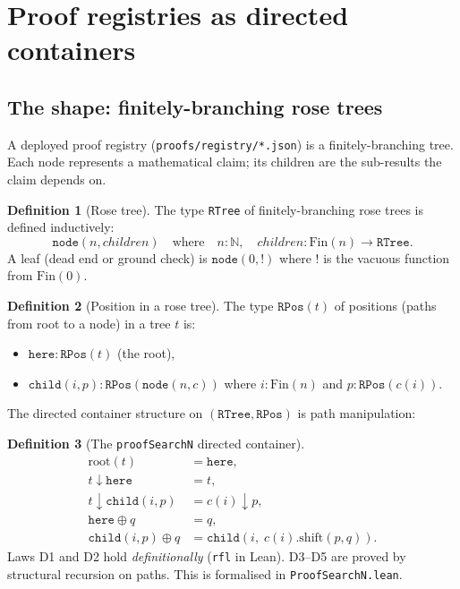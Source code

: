 \documentclass[11pt,a4paper]{article}
\theoremstyle{definition}
\newtheorem{definition}{Definition}[section]
\theoremstyle{plain}
\theoremstyle{remark}
\newcommand{\sub}{\mathop{\downarrow}}
\begin{document}
\section{Proof registries as directed containers}

\subsection{The shape: finitely-branching rose trees}

A deployed proof registry (\texttt{proofs/registry/*.json}) is a
finitely-branching tree. Each node represents a mathematical claim; its
children are the sub-results the claim depends on.

\begin{definition}[Rose tree]
The type \texttt{RTree} of finitely-branching rose trees is defined
inductively:
\[
  \texttt{node}(n, \mathit{children}) \quad\text{where}\quad
  n : \mathbb{N},\quad \mathit{children} : \mathrm{Fin}(n) \to \texttt{RTree}.
\]
A leaf (dead end or ground check) is $\texttt{node}(0, !)$ where $!$
is the vacuous function from $\mathrm{Fin}(0)$.
\end{definition}

\begin{definition}[Position in a rose tree]
The type $\texttt{RPos}(t)$ of positions (paths from root to a node)
in a tree $t$ is:
\begin{itemize}[nosep]
  \item $\texttt{here} : \texttt{RPos}(t)$ \quad (the root),
  \item $\texttt{child}(i, p) : \texttt{RPos}(\texttt{node}(n, c))$
    \quad where $i : \mathrm{Fin}(n)$ and $p : \texttt{RPos}(c(i))$.
\end{itemize}
\end{definition}

The directed container structure on $(\texttt{RTree}, \texttt{RPos})$
is path manipulation:

\begin{definition}[The \texttt{proofSearchN} directed container]
\label{def:proofsearchn}
\begin{align*}
  \mathrm{root}(t) &= \texttt{here}, \\
  t \sub \texttt{here} &= t, \\
  t \sub \texttt{child}(i, p) &= c(i) \sub p, \\
  \texttt{here} \oplus q &= q, \\
  \texttt{child}(i, p) \oplus q &= \texttt{child}(i,\; c(i).\mathrm{shift}(p, q)).
\end{align*}
Laws D1 and D2 hold \emph{definitionally} (\texttt{rfl} in Lean).
D3--D5 are proved by structural recursion on paths. This is formalised
in \texttt{ProofSearchN.lean}.
\end{definition}
\end{document}
